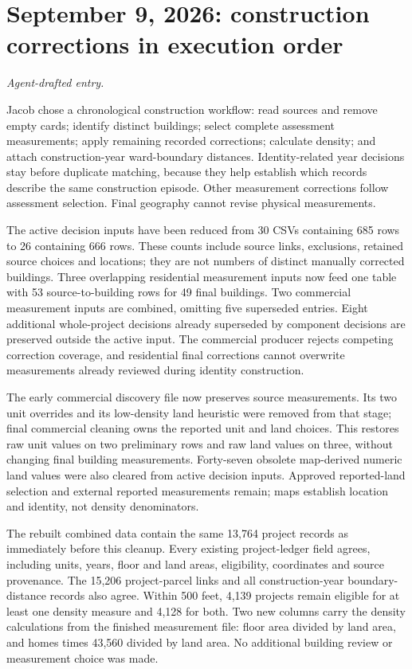 \clearpage
\section*{September 9, 2026: construction corrections in execution order}
\textit{Agent-drafted entry.}

Jacob chose a chronological construction workflow: read sources and remove empty
cards; identify distinct buildings; select complete assessment measurements;
apply remaining recorded corrections; calculate density; and attach
construction-year ward-boundary distances. Identity-related year decisions stay
before duplicate matching, because they help establish which records describe
the same construction episode. Other measurement corrections follow assessment
selection. Final geography cannot revise physical measurements.

The active decision inputs have been reduced from 30 CSVs containing 685 rows to
26 containing 666 rows. These counts include source links, exclusions, retained
source choices and locations; they are not numbers of distinct manually corrected
buildings. Three overlapping residential measurement inputs now feed one table
with 53 source-to-building rows for 49 final buildings. Two commercial measurement
inputs are combined, omitting five superseded entries. Eight additional
whole-project decisions already superseded by component decisions are preserved
outside the active input. The commercial producer rejects competing correction
coverage, and residential final corrections cannot overwrite measurements already
reviewed during identity construction.

The early commercial discovery file now preserves source measurements. Its two
unit overrides and its low-density land heuristic were removed from that stage;
final commercial cleaning owns the reported unit and land choices. This restores
raw unit values on two preliminary rows and raw land values on three, without
changing final building measurements. Forty-seven obsolete map-derived numeric
land values were also cleared from active decision inputs. Approved reported-land
selection and external reported measurements remain; maps establish location and
identity, not density denominators.

The rebuilt combined data contain the same 13,764 project records as immediately
before this cleanup. Every existing project-ledger field agrees, including units,
years, floor and land areas, eligibility, coordinates and source provenance.
The 15,206 project-parcel links and all construction-year boundary-distance records
also agree. Within 500 feet, 4,139 projects remain eligible for at least one density
measure and 4,128 for both. Two new columns carry the density calculations from the
finished measurement file: floor area divided by land area, and homes times 43,560
divided by land area. No additional building review or measurement choice was made.

